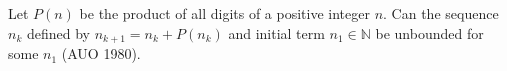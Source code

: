 Let $P(n)$ be the product of all digits of a positive integer $n$. Can the sequence $n_k$ defined by $n_{k+1} = n_k + P(n_k)$ and initial term $n_1 \in \mathbb{N}$ be unbounded for some $n_1$ (AUO 1980).
